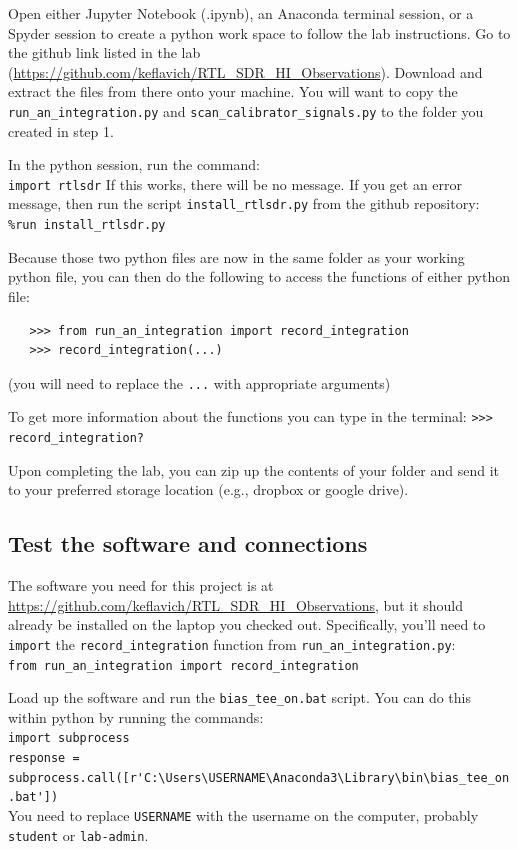 \documentclass[11pt]{article}
\begin{document}
Open either Jupyter Notebook (.ipynb), an Anaconda terminal session, or a
Spyder session to create a python work space to follow the lab instructions.
Go to the github link listed in the lab
(\url{https://github.com/keflavich/RTL_SDR_HI_Observations}). Download and
extract the files from there onto your machine. You will want to copy the
\verb|run_an_integration.py| and \verb|scan_calibrator_signals.py| to the
folder you created in step 1. 

In the python session, run the command: \\
\verb|import rtlsdr|
If this works, there will be no message.  If you get an error message, then
run the script \verb|install_rtlsdr.py| from the github repository:\\
\verb|%run install_rtlsdr.py|

Because those two python files are now in the same folder as your working
python file, you can then do the following to access the functions of either
python file:
\begin{verbatim}
   >>> from run_an_integration import record_integration
   >>> record_integration(...)
\end{verbatim}
(you will need to replace the \verb|...| with appropriate arguments)

To get more information about the functions you can type in the terminal:
   \verb|>>> record_integration?|

Upon completing the lab, you can zip up the contents of your folder and send it
to your preferred storage location (e.g., dropbox or google drive).


\subsection{Test the software and connections}

The software you need for this project is at
\url{https://github.com/keflavich/RTL_SDR_HI_Observations}, but it should
already be installed on the laptop you checked out.  Specifically, you'll need
to \texttt{import} the \texttt{record\_integration} function from
\texttt{run\_an\_integration.py}:\\
\verb|from run_an_integration import record_integration|

Load up the software and run the \texttt{bias\_tee\_on.bat} script.
You can do this within python by running the commands:\\
\verb|import subprocess|\\
\verb|response = subprocess.call([r'C:\Users\USERNAME\Anaconda3\Library\bin\bias_tee_on.bat'])|\\
You need to replace \texttt{USERNAME} with the username on the computer,
probably \texttt{student} or \texttt{lab-admin}.
\end{document}
